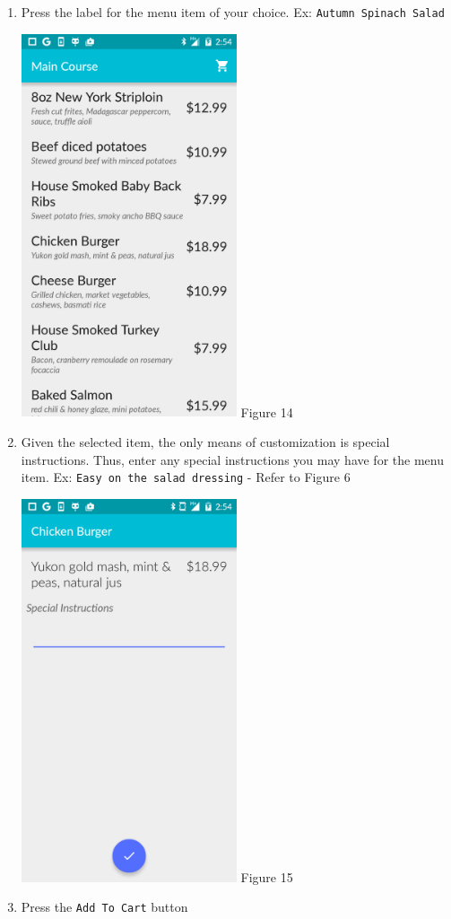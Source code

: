 \documentclass[12pt, titlepage]{article}
\begin{document}
\begin{enumerate}
		\item Press the label for the menu item of your choice. Ex: 					\texttt{Autumn Spinach Salad}
		\begin{center}
			\includegraphics[width=0.5\textwidth]{appetizers.png}
			\linebreak Figure 14
		\end{center}				
		
		\item Given the selected item, the only means of customization is special instructions. Thus, enter any special instructions you may have for the menu 					item. Ex: \texttt{Easy on the salad dressing} - Refer to Figure 			6
		\begin{center}
			\includegraphics[width=0.5\textwidth]{instructions.png}
			\linebreak Figure 15
		\end{center}		
	
		\item Press the \texttt{Add To Cart} button
	\end{enumerate}
\end{document}
